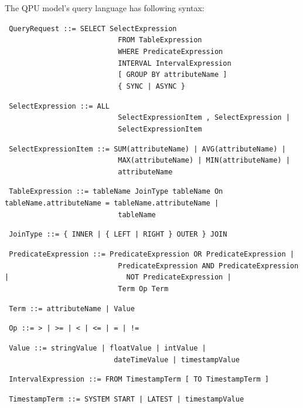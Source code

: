 \medskip
\noindent
The QPU model's query language has following syntax:

{\obeylines\obeyspaces
\texttt{
QueryRequest          ::=  SELECT SelectExpression
~~~~~~~~~~~~~~~~~~~~~~~~~~~FROM TableExpression
~~~~~~~~~~~~~~~~~~~~~~~~~~~WHERE PredicateExpression
~~~~~~~~~~~~~~~~~~~~~~~~~~~INTERVAL IntervalExpression
~~~~~~~~~~~~~~~~~~~~~~~~~~~[ GROUP BY attributeName ]
~~~~~~~~~~~~~~~~~~~~~~~~~~~\{ SYNC | ASYNC \}
}}

{\obeylines\obeyspaces
\texttt{
SelectExpression      ::=  ALL
~~~~~~~~~~~~~~~~~~~~~~~~~~~SelectExpressionItem , SelectExpression |
~~~~~~~~~~~~~~~~~~~~~~~~~~~SelectExpressionItem
}}

{\obeylines\obeyspaces
\texttt{
SelectExpressionItem  ::=  SUM(attributeName) | AVG(attributeName) |
~~~~~~~~~~~~~~~~~~~~~~~~~~~MAX(attributeName) | MIN(attributeName) |
~~~~~~~~~~~~~~~~~~~~~~~~~~~attributeName
}}

{\obeylines\obeyspaces
\texttt{
TableExpression       ::=  tableName JoinType tableName On tableName.attributeName = tableName.attributeName |
~~~~~~~~~~~~~~~~~~~~~~~~~~~tableName
}}

{\obeylines\obeyspaces
\texttt{
JoinType              ::=  \{ INNER | \{ LEFT | RIGHT \} OUTER \} JOIN
}}

{\obeylines\obeyspaces
\texttt{
PredicateExpression   ::=  PredicateExpression OR PredicateExpression |
~~~~~~~~~~~~~~~~~~~~~~~~~~~PredicateExpression AND PredicateExpression |
~~~~~~~~~~~~~~~~~~~~~~~~~~~NOT PredicateExpression |
~~~~~~~~~~~~~~~~~~~~~~~~~~~Term Op Term
}}

{\obeylines\obeyspaces
\texttt{
Term                  ::=  attributeName | Value
}}

{\obeylines\obeyspaces
\texttt{
Op                    ::= > | >= | < | <= | = | !=
}}

{\obeylines\obeyspaces
\texttt{
Value                 ::= stringValue | floatValue | intValue |
~~~~~~~~~~~~~~~~~~~~~~~~~~dateTimeValue | timestampValue
}}

{\obeylines\obeyspaces
\texttt{
IntervalExpression   ::= FROM TimestampTerm [ TO TimestampTerm ]
}}

{\obeylines\obeyspaces
\texttt{
TimestampTerm         ::= SYSTEM START | LATEST | timestampValue
}}

